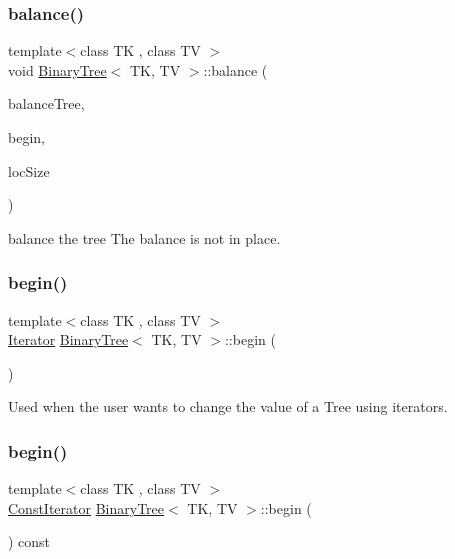 \subsubsection{\texorpdfstring{balance()}{balance()}}
{\footnotesize\ttfamily template$<$class TK , class TV $>$ \\
void \mbox{\hyperlink{classBinaryTree}{Binary\+Tree}}$<$ TK, TV $>$\+::balance (\begin{DoxyParamCaption}\item[{\mbox{\hyperlink{classBinaryTree}{Binary\+Tree}}$<$ TK, TV $>$ \&}]{balance\+Tree,  }\item[{\mbox{\hyperlink{classBinaryTree_1_1Iterator}{Iterator}}}]{begin,  }\item[{std\+::size\+\_\+t}]{loc\+Size }\end{DoxyParamCaption})}

balance the tree The balance is not in place. \mbox{\label{classBinaryTree_a828acf65e70cf4b6e106807a052ca508}} 
\subsubsection{\texorpdfstring{begin()}{begin()}\hspace{0.1cm}{\footnotesize\ttfamily [1/2]}}
{\footnotesize\ttfamily template$<$class TK , class TV $>$ \\
\mbox{\hyperlink{classBinaryTree_1_1Iterator}{Iterator}} \mbox{\hyperlink{classBinaryTree}{Binary\+Tree}}$<$ TK, TV $>$\+::begin (\begin{DoxyParamCaption}{ }\end{DoxyParamCaption})\hspace{0.3cm}{\ttfamily [inline]}}

Used when the user wants to change the value of a Tree using iterators. \mbox{\label{classBinaryTree_aaf9049aa9e91bed50e9543b6db442d80}} 
\subsubsection{\texorpdfstring{begin()}{begin()}\hspace{0.1cm}{\footnotesize\ttfamily [2/2]}}
{\footnotesize\ttfamily template$<$class TK , class TV $>$ \\
\mbox{\hyperlink{classBinaryTree_1_1ConstIterator}{Const\+Iterator}} \mbox{\hyperlink{classBinaryTree}{Binary\+Tree}}$<$ TK, TV $>$\+::begin (\begin{DoxyParamCaption}{ }\end{DoxyParamCaption}) const\hspace{0.3cm}{\ttfamily [inline]}}

